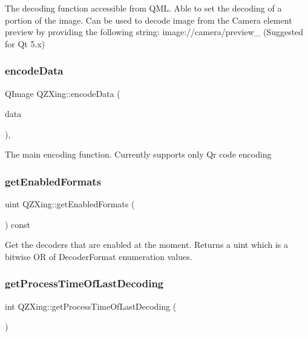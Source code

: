 The decoding function accessible from Q\+ML. Able to set the decoding of a portion of the image. Can be used to decode image from the Camera element preview by providing the following string\+: image\+://camera/preview\+\_ (Suggested for Qt 5.\+x) \mbox{\label{class_q_z_xing_af57e44a47644b0d13edf684515301f2d}} 
\subsubsection{\texorpdfstring{encode\+Data}{encodeData}}
{\footnotesize\ttfamily Q\+Image Q\+Z\+Xing\+::encode\+Data (\begin{DoxyParamCaption}\item[{const Q\+String \&}]{data }\end{DoxyParamCaption})\hspace{0.3cm}{\ttfamily [static]}, {\ttfamily [slot]}}

The main encoding function. Currently supports only Qr code encoding \mbox{\label{class_q_z_xing_a863d1ac83ea9728880d0494a5d8e98e0}} 
\subsubsection{\texorpdfstring{get\+Enabled\+Formats}{getEnabledFormats}}
{\footnotesize\ttfamily uint Q\+Z\+Xing\+::get\+Enabled\+Formats (\begin{DoxyParamCaption}{ }\end{DoxyParamCaption}) const\hspace{0.3cm}{\ttfamily [slot]}}

Get the decoders that are enabled at the moment. Returns a uint which is a bitwise OR of Decoder\+Format enumeration values. \mbox{\label{class_q_z_xing_ab15359090739e8dc9850d965caca8eca}} 
\subsubsection{\texorpdfstring{get\+Process\+Time\+Of\+Last\+Decoding}{getProcessTimeOfLastDecoding}}
{\footnotesize\ttfamily int Q\+Z\+Xing\+::get\+Process\+Time\+Of\+Last\+Decoding (\begin{DoxyParamCaption}{ }\end{DoxyParamCaption})\hspace{0.3cm}{\ttfamily [slot]}}

